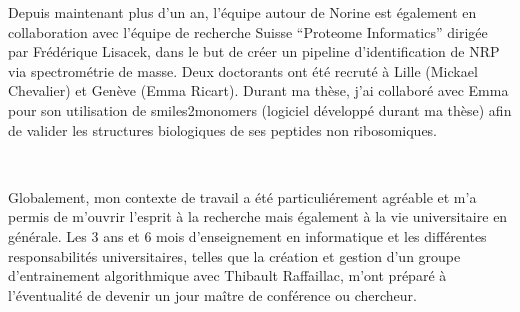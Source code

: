 Depuis maintenant plus d'un an, l'équipe autour de Norine est également en collaboration avec l'équipe de recherche Suisse ``Proteome Informatics'' dirigée par Frédérique Lisacek, dans le but de créer un pipeline d'identification de NRP via spectrométrie de masse.
Deux doctorants ont été recruté à Lille (Mickael Chevalier) et Genève (Emma Ricart).
Durant ma thèse, j'ai collaboré avec Emma pour son utilisation de smiles2monomers (logiciel développé durant ma thèse) afin de valider les structures biologiques de ses peptides non ribosomiques.

~~

Globalement, mon contexte de travail a été particuliérement agréable et m'a permis de m'ouvrir l'esprit à la recherche mais également à la vie universitaire en générale.
Les 3 ans et 6 mois d'enseignement en informatique et les différentes responsabilités universitaires, telles que la création et gestion d'un groupe d'entrainement algorithmique avec Thibault Raffaillac, m'ont préparé à l'éventualité de devenir un jour maître de conférence ou chercheur.



























